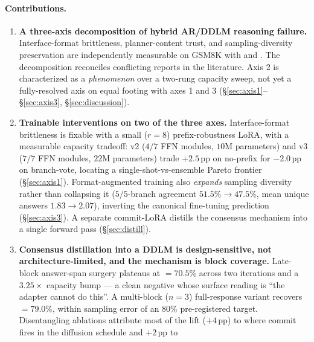 \clearpage
\paragraph{Contributions.}
\begin{enumerate}
    \item \textbf{A three-axis decomposition of hybrid AR/DDLM
          reasoning failure.}  Interface-format brittleness,
          planner-content trust, and sampling-diversity preservation
          are independently measurable on GSM8K with \LLaDA{} and
          .  The decomposition reconciles
          conflicting reports in the literature.  Axis 2 is
          characterized as a \emph{phenomenon} over a two-rung
          capacity sweep, not yet a fully-resolved axis on equal
          footing with axes 1 and 3
          (\S\ref{sec:axis1}--\S\ref{sec:axis3},
          \S\ref{sec:discussion}).
    \item \textbf{Trainable interventions on two of the three
          axes.}  Interface-format brittleness is fixable with a
          small ($r{=}8$) prefix-robustness LoRA, with a measurable
          capacity tradeoff: v2 ($4/7$ FFN modules, $10$M
          parameters) and v3 ($7/7$ FFN modules, $22$M parameters)
          trade $+2.5$\,pp on no-prefix \ctwo{} for $-2.0$\,pp on
          \cmaj{} branch-vote, locating a
          single-shot-vs-ensemble Pareto frontier
          (\S\ref{sec:axis1}).  Format-augmented training also
          \emph{expands} sampling diversity rather than collapsing
          it ($5/5$-branch agreement $51.5\% \to 47.5\%$, mean
          unique answers $1.83 \to 2.07$), inverting the canonical
          fine-tuning prediction (\S\ref{sec:axis3}).  A separate
          commit-LoRA distills the consensus mechanism into a
          single forward pass (\S\ref{sec:distill}).
    \item \textbf{Consensus distillation into a DDLM is
          design-sensitive, not architecture-limited, and the
          mechanism is block coverage.}  Late-block answer-span
          surgery plateaus at \ctwoc{}$=70.5\%$ across two
          iterations and a $3.25\times$ capacity bump --- a clean
          negative whose surface reading is ``the adapter cannot
          do this''.  A multi-block ($n{=}3$) full-response
          variant recovers \ctwoc{}$=79.0\%$, within sampling
          error of an $80\%$ pre-registered target.  Disentangling
          ablations attribute most of the lift ($+4$\,pp) to where
          commit fires in the diffusion schedule and $+2$\,pp to

\end{enumerate}
